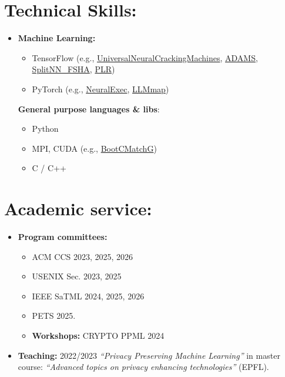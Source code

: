 \documentclass[margin, 10pt]{article} %
\begin{document}
\section*{Technical Skills:}
\fi 
\begin{itemize}
	\item  \textbf{Machine Learning:} 
	\begin{itemize}
		\item TensorFlow (e.g., \href{https://github.com/TheAdamProject/UniversalNeuralCrackingMachines}{UniversalNeuralCrackingMachines}, \href{https://github.com/TheAdamProject/adams}{ADAMS}, \href{https://github.com/pasquini-dario/SplitNN_FSHA}{SplitNN\_FSHA}, \href{https://github.com/pasquini-dario/PLR}{PLR})
		\item PyTorch (e.g., \href{https://github.com/pasquini-dario/LLM_NeuralExec}{NeuralExec},  \href{https://github.com/pasquini-dario/LLMmap}{LLMmap})
	\end{itemize}
	
	\textbf{General purpose languages \& libs}:
	\begin{itemize}
		\item Python
		\item MPI, CUDA (e.g., \href{https://github.com/bootcmatch/BootCMatchG/}{BootCMatchG})
		\item  C / C++
	\end{itemize}
	
\end{itemize}

\noindent\makebox[\linewidth]{\rule{.2\paperwidth}{0.3pt}}
\section*{Academic service:}  
\begin{itemize}
	\item \textbf{Program committees:}
	\begin{itemize}
		\item ACM CCS 2023, 2025, 2026
		\item USENIX Sec. 2023, 2025
		\item IEEE SaTML 2024, 2025, 2026
		\item PETS 2025.
	\end{itemize} 
	\begin{itemize}
		\item \textbf{Workshops:} CRYPTO PPML 2024
	\end{itemize}
	\item \textbf{Teaching:} 2022/2023 \textit{``Privacy Preserving Machine Learning''} in  master course: \textit{``Advanced topics on privacy enhancing technologies''} (EPFL).
\end{itemize}
\end{document}
